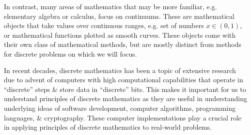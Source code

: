 \documentclass{article}
\begin{document}
\begin{enumerate}
\begin{itemize}
\begin{itemize}
			In contrast, many areas of mathematics that may be more familiar, e.g. elementary algebra or calculus, focus on continuums. These are mathematical objects that take values over continuous ranges, e.g. set of numbers $x\in(0,1)$, or mathematical functions plotted as smooth curves. These objects come with their own class of mathematical methods, but are mostly distinct from methods for discrete problems on which we will focus.
			
			In recent decades, discrete mathematics has been a topic of extensive research due to advent of computers with high computational capabilities that operate in ``discrete'' steps \& store data in ``discrete'' bits. This makes it important for us to understand principles of discrete mathematics as they are useful in understanding underlying ideas of software development, computer algorithms, programming languages, \& cryptography. These computer implementations play a crucial role in applying principles of discrete mathematics to real-world problems.
			

\end{itemize}
\end{itemize}
\end{enumerate}
\end{document}
